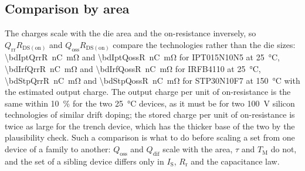 \documentclass[10pt,a4paper]{scrartcl}
\newcommand{\Qrr}{Q_\mathrm{rr}}
\newcommand{\Qdif}{Q_\mathrm{dif}}
\newcommand{\Qoss}{Q_\mathrm{oss}}
\newcommand{\TM}{T_\mathrm{M}}
\newcommand{\IS}{I_\mathrm{S}}
\newcommand{\Rr}{R_\mathrm{r}}
\newcommand{\Rds}{R_\mathrm{DS(on)}}
\newcommand{\IPT}{IPT015N10N5}
\newcommand{\IRF}{IRFB4110}
\newcommand{\STP}{STP30N10F7}
\begin{document}
\subsection{Comparison by area}
\label{sec:area}
The charges scale with the die area and the on-resistance inversely, so $\Qrr\Rds$ and $\Qoss\Rds$ compare the technologies rather than the die sizes: \SI{\bdIptQrrR}{\nano\coulomb\milli\ohm} and \SI{\bdIptQossR}{\nano\coulomb\milli\ohm} for \IPT{} at \SI{25}{\celsius}, \SI{\bdIrfQrrR}{\nano\coulomb\milli\ohm} and \SI{\bdIrfQossR}{\nano\coulomb\milli\ohm} for \IRF{} at \SI{25}{\celsius}, \SI{\bdStpQrrR}{\nano\coulomb\milli\ohm} and \SI{\bdStpQossR}{\nano\coulomb\milli\ohm} for \STP{} at \SI{150}{\celsius} with the estimated output charge. The output charge per unit of on-resistance is the same within \SI{10}{\percent} for the two \SI{25}{\celsius} devices, as it must be for two \SI{100}{\volt} silicon technologies of similar drift doping; the stored charge per unit of on-resistance is twice as large for the trench device, which has the thicker base of the two by the plausibility check. Such a comparison is what to do before scaling a set from one device of a family to another: $\Qoss$ and $\Qdif$ scale with the area, $\tau$ and $\TM$ do not, and the set of a sibling device differs only in $\IS$, $\Rr$ and the capacitance law.

\end{document}
